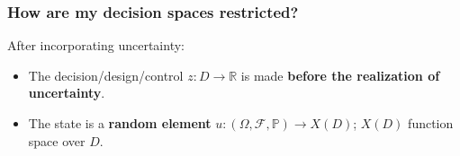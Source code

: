 \documentclass[aspectratio=169,xcolor=dvipsnames,10pt]{beamer}
\begin{document}
\begin{frame}\frametitle{How are my decision spaces restricted?}
\begin{exampleblock}{}
After incorporating uncertainty:
\begin{itemize}
\item The decision/design/control $z : D \to \mathbb R$ is made \textbf{before the realization of uncertainty}.
\item The state is a \textbf{random element} $u : (\Omega,\mathcal{F},\mathbb P) \to X(D)$; $X(D)$ function space over $D$.
\end{itemize}
\end{exampleblock}


\end{frame}
\end{document}

